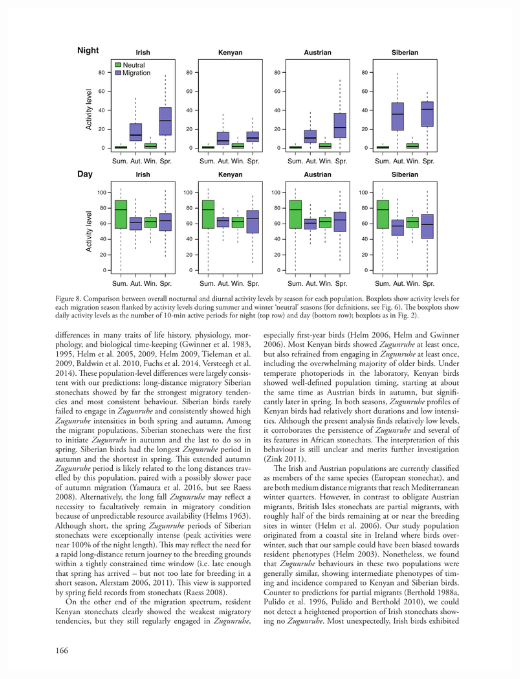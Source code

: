 \documentclass[a4paper, twoside]{templates/ociamthesis}
\begin{document}
\begin{center}\includegraphics[width=1\linewidth]{pdf_chapters/zug/zug_crop_Part12} \end{center}
\end{document}
